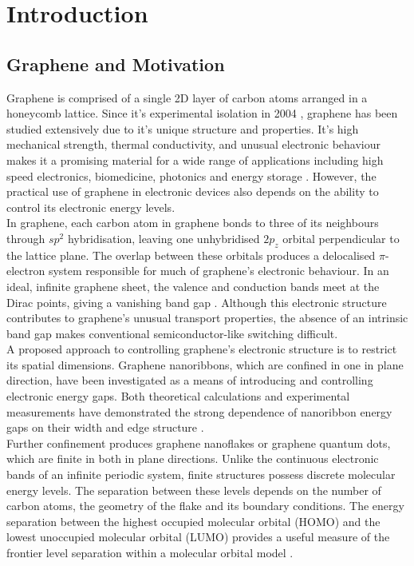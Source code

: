\chapter{Introduction}\label{ch:introduction}


\section{Graphene and Motivation}
\label{sec:graphene_motivation}

Graphene is comprised of a single 2D layer of carbon atoms arranged in a honeycomb lattice. Since it’s experimental isolation in 2004 \parencite{novoselov_electric_2004}, graphene has been studied extensively due to it’s unique structure and properties. It’s high mechanical strength, thermal conductivity, and unusual electronic behaviour makes it a promising material for a wide range of applications including high speed electronics, biomedicine, photonics and energy storage \parencite{singh_graphene_2025}. However, the practical use of graphene in electronic devices also depends on the ability to control its electronic energy levels. \\

\noindent In graphene, each carbon atom in graphene bonds to three of its neighbours through $sp^2$ hybridisation, leaving one unhybridised $2p_z$ orbital perpendicular to the lattice plane. The overlap between these orbitals produces a delocalised $\pi$-electron system responsible for much of graphene's electronic behaviour. In an ideal, infinite graphene sheet, the valence and conduction bands meet at the Dirac points, giving a vanishing band gap \parencite{castro_neto_electronic_2009}. Although this electronic structure contributes to graphene's unusual transport properties, the absence of an intrinsic band gap makes conventional semiconductor-like switching difficult. \\

\noindent A proposed approach to controlling graphene's electronic structure is to restrict its spatial dimensions. Graphene nanoribbons, which are confined in one in plane direction, have been investigated as a means of introducing and controlling electronic energy gaps. Both theoretical calculations and experimental measurements have demonstrated the strong dependence of nanoribbon energy gaps on their width and edge structure \parencite{son_energy_2006,han_energy_2007}. \\

\noindent Further confinement produces graphene nanoflakes or graphene quantum dots, which are finite in both in plane directions. Unlike the continuous electronic bands of an infinite periodic system, finite structures possess discrete molecular energy levels. The separation between these levels depends on the number of carbon atoms, the geometry of the flake and its boundary conditions. The energy separation between the highest occupied molecular orbital (HOMO) and the lowest unoccupied molecular orbital (LUMO) provides a useful measure of the frontier level separation within a molecular orbital model \parencite{jeongCalculationElectronicStructures2024}. \\

